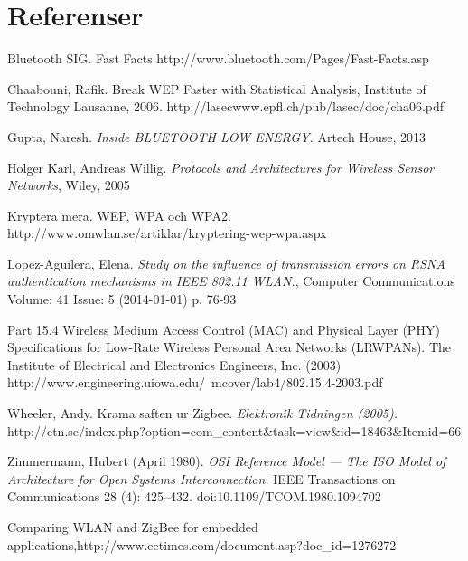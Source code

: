 \documentclass[a4paper,12pt,fleqn]{article}
\begin{document}
\newpage 
\section*{Referenser}

Bluetooth SIG. Fast Facts http://www.bluetooth.com/Pages/Fast-Facts.asp 

Chaabouni, Rafik. Break WEP Faster with Statistical Analysis, Institute of Technology Lausanne, 2006. http://lasecwww.epfl.ch/pub/lasec/doc/cha06.pdf

Gupta, Naresh. \emph{Inside BLUETOOTH LOW ENERGY.} Artech House, 2013

Holger Karl, Andreas Willig. \emph{Protocols and Architectures for Wireless Sensor Networks}, Wiley, 2005

Kryptera mera. WEP, WPA och WPA2. http://www.omwlan.se/artiklar/kryptering-wep-wpa.aspx 

Lopez-Aguilera, Elena. \emph{Study on the influence of transmission errors on RSNA authentication mechanisms in IEEE 802.11 WLAN.}, Computer Communications Volume: 41 Issue: 5 (2014-01-01) p. 76-93

Part 15.4 Wireless Medium Access Control (MAC) and Physical Layer (PHY) Specifications for Low-Rate Wireless Personal Area Networks (LR\text{-}WPANs). The Institute of Electrical and Electronics Engineers, Inc. (2003) \\ http://www.engineering.uiowa.edu/~mcover/lab4/802.15.4-2003.pdf

Wheeler, Andy. Krama saften ur Zigbee. \emph{Elektronik Tidningen (2005).} \\ http://etn.se/index.php?option=com\_content\&task=view\&id=18463\&Itemid=66

Zimmermann, Hubert (April 1980).\emph{ OSI Reference Model — The ISO Model of Architecture for Open Systems Interconnection.} IEEE Transactions on Communications 28 (4): 425–432. doi:10.1109/TCOM.1980.1094702

Comparing WLAN and ZigBee for embedded applications,http://www.eetimes.com/document.asp?doc\_id=1276272
\end{document}
